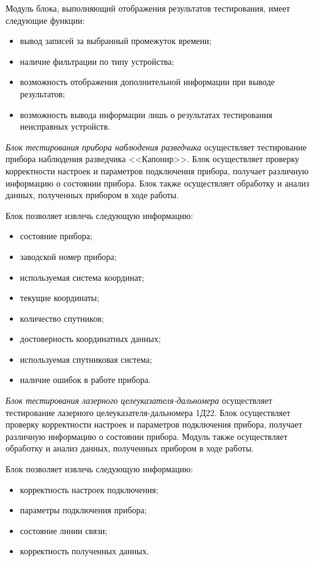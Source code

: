 Модуль блока, выполняющий отображения результатов тестирования, имеет следующие функции:
\begin{itemize}
	\item вывод записей за выбранный промежуток времени;
	\item наличие фильтрации по типу устройства;
	\item возможность отображения дополнительной информации при выводе результатов;
	\item возможность вывода информации лишь о результатах тестирования неисправных устройств.
\end{itemize}

\textit{Блок тестирования прибора наблюдения разведчика} осуществляет тестирование прибора наблюдения разведчика
<<Капонир>>. Блок осуществляет проверку корректности настроек и параметров подключения прибора, получает различную
информацию о
состоянии прибора. Блок также осуществляет обработку и анализ данных, полученных прибором в ходе работы.

Блок позволяет извлечь следующую информацию:
\begin{itemize}
		\item состояние прибора;
		\item заводской номер прибора;
		\item используемая система координат;
		\item текущие координаты;
		\item количество спутников;
		\item достоверность координатных данных;
		\item используемая спутниковая система;
		\item наличие ошибок в работе прибора.
\end{itemize}

\textit{Блок тестирования лазерного целеуказателя-дальномера} осуществляет тестирование лазерного
целеуказателя-дальномера 1Д22.
Блок осуществляет проверку корректности настроек и параметров подключения прибора, получает различную
информацию о
состоянии прибора. Модуль также осуществляет обработку и анализ данных, полученных прибором в ходе работы.

Блок позволяет извлечь следующую информацию:
\begin{itemize}
		\item корректность настроек подключения;
		\item параметры подключения прибора;
		\item состояние линии связи;
		\item корректность полученных данных.
\end{itemize}
